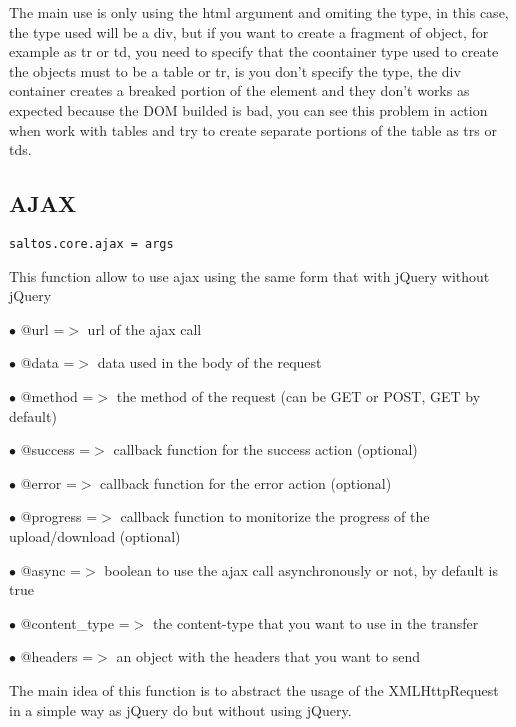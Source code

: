 \documentclass[a4paper]{book}
\begin{document}
The main use is only using the html argument and omiting the type, in this case, the
type used will be a div, but if you want to create a fragment of object, for example
as tr or td, you need to specify that the coontainer type used to create the objects
must to be a table or tr, is you don't specify the type, the div container creates
a breaked portion of the element and they don't works as expected because the DOM
builded is bad, you can see this problem in action when work with tables and try to
create separate portions of the table as trs or tds.

\hypertarget{toc517}{}
\subsection{AJAX}

\begin{lstlisting}
saltos.core.ajax = args
\end{lstlisting}

This function allow to use ajax using the same form that with jQuery without jQuery

\begin{compactitem}
\item[\color{myblue}$\bullet$] @url          =$>$ url of the ajax call
\item[\color{myblue}$\bullet$] @data         =$>$ data used in the body of the request
\item[\color{myblue}$\bullet$] @method       =$>$ the method of the request (can be GET or POST, GET by default)
\item[\color{myblue}$\bullet$] @success      =$>$ callback function for the success action (optional)
\item[\color{myblue}$\bullet$] @error        =$>$ callback function for the error action (optional)
\item[\color{myblue}$\bullet$] @progress     =$>$ callback function to monitorize the progress of the upload/download (optional)
\item[\color{myblue}$\bullet$] @async        =$>$ boolean to use the ajax call asynchronously or not, by default is true
\item[\color{myblue}$\bullet$] @content\_type =$>$ the content-type that you want to use in the transfer
\item[\color{myblue}$\bullet$] @headers      =$>$ an object with the headers that you want to send
\end{compactitem}

The main idea of this function is to abstract the usage of the XMLHttpRequest in a simple
way as jQuery do but without using jQuery.
\end{document}
